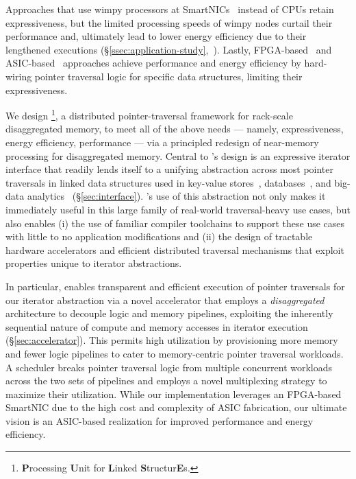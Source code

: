 Approaches that use wimpy processors at SmartNICs~\cite{rmc_hotnets20, redn} instead of CPUs retain expressiveness, but the limited processing speeds of wimpy nodes curtail their performance and, ultimately lead to lower energy efficiency due to their lengthened executions (\S\ref{ssec:application-study},~\cite{clio}). Lastly, FPGA-based~\cite{clio, strom, sun2023demystifying} and ASIC-based~\cite{impica, walkers} approaches achieve performance and energy efficiency by hard-wiring pointer traversal logic for specific data structures, limiting their expressiveness.  


We design \pulse\footnote{\textbf{P}rocessing \textbf{U}nit for \textbf{L}inked \textbf{S}tructur\textbf{E}s.}, a distributed pointer-traversal framework for rack-scale disaggregated memory, to meet all of the above needs --- namely, expressiveness, energy efficiency, performance --- via a principled redesign of near-memory processing for disaggregated memory. Central to \pulse's design is an expressive iterator interface that readily lends itself to a unifying abstraction across most pointer traversals in linked data structures used in key-value stores~\cite{redis, memcached}, databases~\cite{wiredtiger, btree1, btree2, trie1, trie3}, and big-data analytics~\cite{powergraph, graphx, graphchi, pagerank} (\S\ref{sec:interface}). \pulse's use of this abstraction not only makes it immediately useful in this large family of real-world traversal-heavy use cases, but also enables (i) the use of familiar compiler toolchains to support these use cases with little to no application modifications and (ii) the design of tractable hardware accelerators and efficient distributed traversal mechanisms that exploit properties unique to iterator abstractions.


In particular, \pulse enables transparent and efficient execution of pointer traversals for our iterator abstraction via a novel accelerator that employs a \emph{disaggregated} architecture to decouple logic and memory pipelines, exploiting the inherently sequential nature of compute and memory accesses in iterator execution (\S\ref{sec:accelerator}). This permits high utilization by provisioning more memory and fewer logic pipelines to cater to memory-centric pointer traversal workloads. A scheduler breaks pointer traversal logic from multiple concurrent workloads across the two sets of pipelines and employs a novel multiplexing strategy to maximize their utilization. While our implementation leverages an FPGA-based SmartNIC due to the high cost and complexity of ASIC fabrication, our ultimate vision is an ASIC-based realization for improved performance and energy efficiency. 

